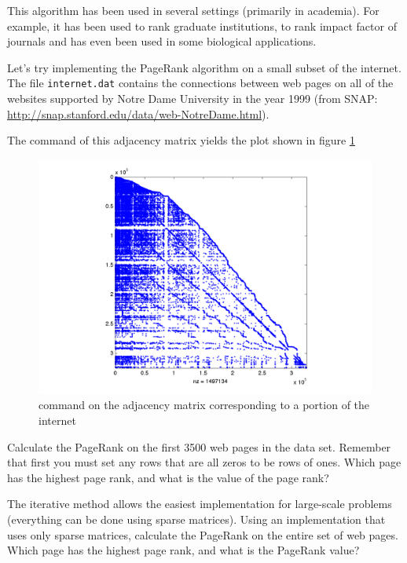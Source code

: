 This algorithm has been used in several settings (primarily in academia).
For example, it has been used to rank graduate institutions, to rank impact factor of journals and has even been used in some biological applications.

Let's try implementing the PageRank algorithm on a small subset of the internet. The file \texttt{internet.dat} contains the connections between web pages on all of the websites supported by Notre Dame University in the year 1999 (from SNAP: \url{http://snap.stanford.edu/data/web-NotreDame.html}).

The  command of this adjacency matrix yields the plot shown in figure \ref{fig:WebSparse}

\begin{figure}
\centering
\includegraphics[scale = .4]{WebSparse.pdf}
\caption{ command on the adjacency matrix corresponding to a portion of the internet}
\label{fig:WebSparse}
\end{figure}

\begin{problem}
Calculate the PageRank on the first 3500 web pages in the data set. Remember that first you must set any rows that are all zeros to be rows of ones. Which page has the highest page rank, and what is the value of the page rank?
\label{prob:pg_calc}
\end{problem}

\begin{problem}
The iterative method allows the easiest implementation for large-scale problems (everything can be done using sparse matrices).
Using an implementation that uses only sparse matrices, calculate the PageRank on the entire set of web pages.
Which page has the highest page rank, and what is the PageRank value?
\end{problem}

